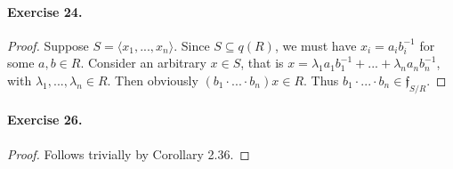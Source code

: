 \documentclass[12pt,a4paper]{report}
\theoremstyle{definition}
\theoremstyle{num.custom-title}
\DeclareMathOperator{\sse}{\subseteq}
\begin{document}
\paragraph{Exercise 24.}
\begin{proof}
Suppose $S= \langle x_1,...,x_n \rangle$. Since $S \sse q(R)$, we must have $x_i = a_i b_i^{-1}$ for some $a,b \in R$. Consider an arbitrary $x \in S$, that is $x = \lambda_1 a_1 b_1^{-1} + ... + \lambda_n a_n b_n^{-1}$, with $\lambda_1,...,\lambda_n \in R$. Then obviously $(b_1 \cdot ... \cdot b_n) x \in R$. Thus $b_1 \cdot ... \cdot b_n \in \mathfrak{f}_{S/R}$.
\end{proof}

\paragraph{Exercise 26.} 
\begin{proof}
Follows trivially by Corollary 2.36.
\end{proof}
\end{document}

